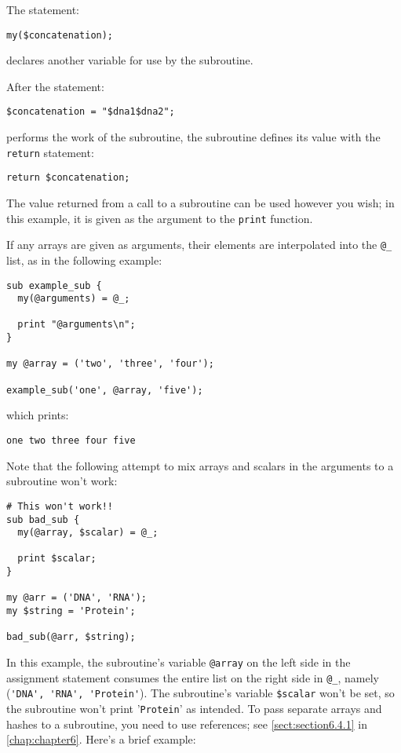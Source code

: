 The statement:

\begin{lstlisting}
my($concatenation);
\end{lstlisting}

declares another variable for use by the subroutine.

After the statement:

\begin{lstlisting}
$concatenation = "$dna1$dna2"; 
\end{lstlisting}

performs the work of the subroutine, the subroutine defines its value with the \verb|return| statement:

\begin{lstlisting}
return $concatenation;
\end{lstlisting}

The value returned from a call to a subroutine can be used however you wish; in this example, it is given as the argument to the \verb|print| function.

If any arrays are given as arguments, their elements are interpolated into the \verb|@_| list, as in the following example:

\begin{lstlisting}
sub example_sub {
  my(@arguments) = @_;

  print "@arguments\n";
}

my @array = ('two', 'three', 'four');

example_sub('one', @array, 'five');
\end{lstlisting}

which prints:
 
\begin{lstlisting}
one two three four five
\end{lstlisting}

Note that the following attempt to mix arrays and scalars in the arguments to a subroutine won't work:

\begin{lstlisting}
# This won't work!!
sub bad_sub {
  my(@array, $scalar) = @_;

  print $scalar;
}

my @arr = ('DNA', 'RNA');
my $string = 'Protein';

bad_sub(@arr, $string);
\end{lstlisting}

In this example, the subroutine's variable \verb|@array| on the left side in the assignment statement consumes the entire list on the right side in \verb|@_|, namely (\verb|'DNA', 'RNA', 'Protein'|). The subroutine's variable \verb|$scalar| won't be set, so the subroutine won't print '\verb|Protein|' as intended. To pass separate arrays and hashes to a subroutine, you need to use references; see \autoref{sect:section6.4.1} in \autoref{chap:chapter6}. Here's a brief example:

